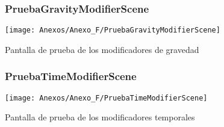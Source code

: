 \begin{figure}[h]
\subsubsection{PruebaGravityModifierScene}
\centering
\texttt{[image: Anexos/Anexo\_F/PruebaGravityModifierScene]}
\caption{Pantalla de prueba de los modificadores de gravedad }
\end{figure}
\clearpage

\begin{figure}[h]
\subsubsection{PruebaTimeModifierScene}
\centering
\texttt{[image: Anexos/Anexo\_F/PruebaTimeModifierScene]}
\caption{Pantalla de prueba de los modificadores temporales}
\end{figure}